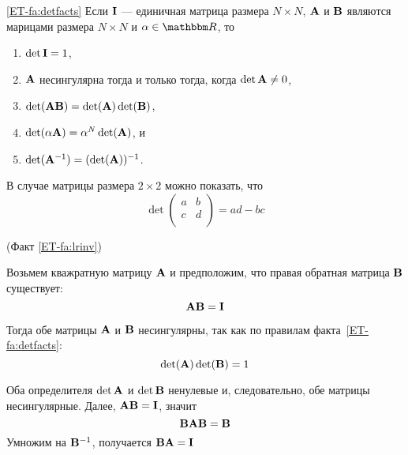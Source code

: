 \begin{frame}

    \vspace{.7em}
    \Fact
    \eqref{ET-fa:detfacts}
    Если $\mathbf I$ --- единичная матрица размера $N \times N$, 
    $\mathbf A$ и $\mathbf B$ являются марицами размера $N \times N$ и 
    $\alpha \in \RR$, то
    \begin{enumerate}
        \item $\det \mathbf I = 1$,
        \item $\mathbf A$ несингулярна тогда и только тогда, когда $\det \mathbf A
            \not= 0$,
        \item $\det(\mathbf A\mathbf B) = \det(\mathbf A) \det(\mathbf B)$,
        \item $\det(\alpha \mathbf A) = \alpha^N \det(\mathbf A)$, и
        \item $\det(\mathbf A^{-1}) = (\det(\mathbf A))^{-1}$.
    \end{enumerate}
    
    \vspace{.7em}
    В случае матрицы размера $2 \times 2$ можно показать, что
    \begin{equation*}
        \label{eq:det22}
        \det 
        \left(
        \begin{array}{cc}
            a & b  \\
            c & d  \\
        \end{array}
        \right)
        = ad - bc
    \end{equation*}
    
\end{frame}


\begin{frame}

    \vspace{2em}
    \Prf (Факт \ref{ET-fa:lrinv})
    
    Возьмем кважратную матрицу $\mathbf A$ и предположим, что
    правая обратная матрица $\mathbf B$ существует: \[\mathbf A \mathbf B = \mathbf I\]
    
    Тогда обе матрицы $\mathbf A$ и $\mathbf B$ несингулярны, так как по правилам
    факта~\ref{ET-fa:detfacts}: \[\det(\mathbf A) \det(\mathbf B) = 1\]
    
    Оба определителя $\det \mathbf A$ и $\det \mathbf B$ ненулевые и, следовательно, обе
    матрицы несингулярные. Далее, $\mathbf A \mathbf B = \mathbf I$, значит 
    \[\mathbf B \mathbf A \mathbf B = \mathbf B\]
    Умножим на $\mathbf B^{-1}$, получается $\mathbf B \mathbf A = \mathbf I$
    
\end{frame}

